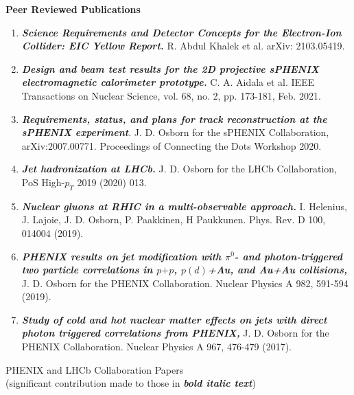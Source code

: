 \documentclass[11pt]{article}
\begin{document}
\begin{flushleft}

\vspace{7pt}
\Large\textbf{Peer Reviewed Publications}\\
\vspace{2pt}
\begin{center}
\normalsize
\begin{enumerate}

	
	\item \textbf{\textit{Science Requirements and Detector Concepts for the Electron-Ion Collider: EIC Yellow Report.}} R. Abdul Khalek et al. arXiv: 2103.05419. 
	\item \textbf{\textit{Design and beam test results for the 2D projective sPHENIX electromagnetic calorimeter prototype.}} C. A. Aidala et al. IEEE Transactions on Nuclear Science, vol. 68, no. 2, pp. 173-181, Feb. 2021.
	
	\item\textbf{\textit{Requirements, status, and plans for track reconstruction at the sPHENIX experiment}}. J. D. Osborn for the sPHENIX Collaboration, arXiv:2007.00771. Proceedings of Connecting the Dots Workshop 2020.
	\item \textbf{\textit{Jet hadronization at LHCb.}} J. D. Osborn for the LHCb Collaboration, PoS High-$p_T$ 2019 (2020) 013.
	\item \textbf{\textit{Nuclear gluons at RHIC in a multi-observable approach.}} I. Helenius, J. Lajoie, J. D. Osborn, P. Paakkinen, H Paukkunen. Phys. Rev. D 100, 014004 (2019).
	\item \textbf{\textit{PHENIX results on jet modification with $\pi^0$- and photon-triggered two particle correlations in $p$$+$$p$, $p(d)$+Au, and Au+Au collisions,}} J. D. Osborn for the PHENIX Collaboration. Nuclear Physics A 982, 591-594 (2019).
	\item \textbf{\textit{Study of cold and hot nuclear matter effects on jets with direct photon triggered correlations from PHENIX,}} J. D. Osborn for the PHENIX Collaboration. Nuclear Physics A 967, 476-479 (2017).
\end{enumerate}

\vspace{14pt}
\begin{flushleft}
\large PHENIX and LHCb Collaboration Papers\\ (significant contribution made to those in \textbf{\textit{bold italic text}})\\
\end{flushleft}


\end{center}
\end{flushleft}
\end{document}
